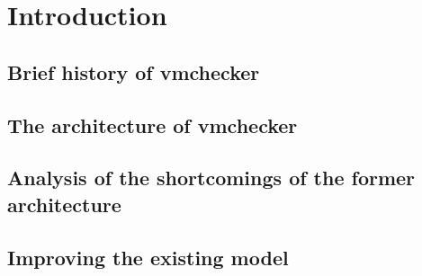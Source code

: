 \chapter{Introduction}
\label{chapter:intro}


\section{Brief history of vmchecker}
\label{sec:vmc-history}

\section{The architecture of vmchecker}
\label{sec:vmc-architecture}

\section{Analysis of the shortcomings of the former architecture}
\label{sec:vmc-analysis}

\section{Improving the existing model}
\label{sec:vmc-improving}



